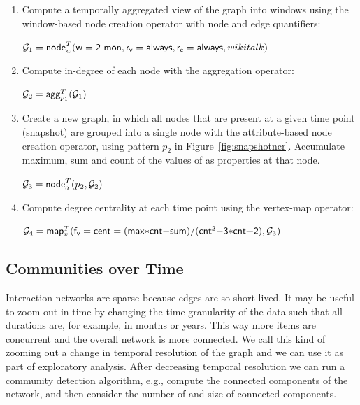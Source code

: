 \begin{enumerate}[itemindent=\dimexpr\labelwidth+\labelsep\relax,leftmargin=0pt]
\item Compute a temporally aggregated view of the graph into windows
  using the window-based node creation operator with 
  node and edge quantifiers:

$\mathcal{G}_1 = \textsf{node}^T_w(\mathsf{w=2~mon},\mathsf{r_v=always},\mathsf{r_e=always},wikitalk)$

\item Compute in-degree of each node with the aggregation operator:

$\mathcal{G}_2 = \textsf{agg}^T_{p_1}(\mathcal{G}_1)$

\item Create a new graph, in which all nodes that are present at a
  given time point (snapshot) are grouped into a single node with the
  attribute-based node creation operator, using pattern $p_2$ in
  Figure~\ref{fig:snapshotncr}.  Accumulate maximum, sum and count of the
  values of  as properties at that node.

$\mathcal{G}_3 =\textsf{node}^T_a(p_2,\mathcal{G}_2)$

%

\item Compute degree centrality at each time point using the vertex-map operator:

$\medmuskip=0mu\ttt_4 = \vmap{\mathsf{f_v=cent=(max*cnt-sum)/(cnt^2-3*cnt+2)}, \ttt_3}$
\end{enumerate}

\subsection{Communities over Time} 

Interaction networks are sparse because edges are so short-lived.  It
may be useful to zoom out in time by changing the time granularity of
the data such that all durations are, for example, in months or years.
This way more items are concurrent and the overall network is more
connected.  We call this kind of zooming out a change in temporal
resolution of the graph and we can use it as part of exploratory
analysis.  After decreasing temporal resolution we can run a community
detection algorithm, e.g., compute the connected components of the
network, and then consider the number of and size of connected
components.  

